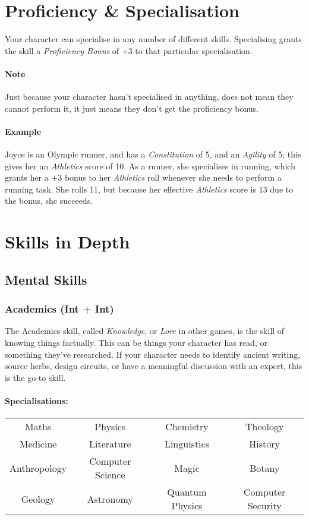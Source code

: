 \section{Proficiency \& Specialisation}
Your character can specialise in any number of different skills.
Specialising grants the skill a \textit{Proficiency Bonus} of $+3$ to that particular specialisation.

\paragraph{Note} Just because your character hasn't specialised in anything, does not mean they cannot perform it, it just means they don't get the proficiency bonus.

\paragraph{Example} Joyce is an Olympic runner, and has a \textit{Constitution} of 5, and an \textit{Agility} of 5; this gives her an \textit{Athletics} score of 10. 
As a runner, she specialises in running, which grants her a $+3$ bonus to her \textit{Athletics} roll whenever she needs to perform a running task.
She rolls 11, but because her effective \textit{Athletics} score is 13 due to the bonus, she succeeds.

\newpage
\section{Skills in Depth}
\subsection{Mental Skills}
\subsubsection{Academics (Int + Int)}
The Academics skill, called \textit{Knowledge}, or \textit{Lore} in other games, is the skill of knowing things factually. 
This can be things your character has read, or something they've researched.
If your character needs to identify ancient writing, source herbs, design circuits, or have a meaningful discussion with an expert, this is the go-to skill.

\paragraph{Specialisations:}
\begin{center}
    \begin{tabular}{c|c|c|c}
        Maths & Physics & Chemistry & Theology \\
        Medicine & Literature & Linguistics & History \\
        Anthropology & Computer Science & Magic & Botany \\
        Geology & Astronomy & Quantum Physics & Computer Security \\
    \end{tabular}
\end{center}

